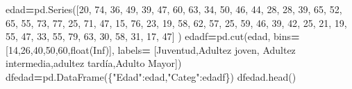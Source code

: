 \documentclass[
]{book}
\newenvironment{Shaded}{\begin{snugshade}}{\end{snugshade}}
\newcommand{\BuiltInTok}[1]{#1}
\newcommand{\DecValTok}[1]{\textcolor[rgb]{0.00,0.00,0.81}{#1}}
\newcommand{\NormalTok}[1]{#1}
\newcommand{\OperatorTok}[1]{\textcolor[rgb]{0.81,0.36,0.00}{\textbf{#1}}}
\newcommand{\StringTok}[1]{\textcolor[rgb]{0.31,0.60,0.02}{#1}}
\theoremstyle{definition}
\theoremstyle{definition}
\theoremstyle{definition}
\theoremstyle{definition}
\theoremstyle{remark}
\begin{document}
\begin{Shaded}
\begin{Highlighting}[]
\NormalTok{edad}\OperatorTok{=}\NormalTok{pd.Series([}\DecValTok{20}\NormalTok{, }\DecValTok{74}\NormalTok{, }\DecValTok{36}\NormalTok{, }\DecValTok{49}\NormalTok{, }\DecValTok{39}\NormalTok{, }\DecValTok{47}\NormalTok{, }\DecValTok{60}\NormalTok{, }\DecValTok{63}\NormalTok{, }\DecValTok{34}\NormalTok{, }\DecValTok{50}\NormalTok{,}
\DecValTok{46}\NormalTok{, }\DecValTok{44}\NormalTok{, }\DecValTok{28}\NormalTok{, }\DecValTok{28}\NormalTok{, }\DecValTok{39}\NormalTok{, }\DecValTok{65}\NormalTok{, }\DecValTok{52}\NormalTok{, }\DecValTok{65}\NormalTok{, }\DecValTok{55}\NormalTok{, }\DecValTok{73}\NormalTok{,}
\DecValTok{77}\NormalTok{, }\DecValTok{25}\NormalTok{, }\DecValTok{71}\NormalTok{, }\DecValTok{47}\NormalTok{, }\DecValTok{15}\NormalTok{, }\DecValTok{76}\NormalTok{, }\DecValTok{23}\NormalTok{, }\DecValTok{19}\NormalTok{, }\DecValTok{58}\NormalTok{, }\DecValTok{62}\NormalTok{,}
\DecValTok{57}\NormalTok{, }\DecValTok{25}\NormalTok{, }\DecValTok{59}\NormalTok{, }\DecValTok{46}\NormalTok{, }\DecValTok{39}\NormalTok{, }\DecValTok{42}\NormalTok{, }\DecValTok{25}\NormalTok{, }\DecValTok{21}\NormalTok{, }\DecValTok{19}\NormalTok{, }\DecValTok{55}\NormalTok{,}
\DecValTok{47}\NormalTok{, }\DecValTok{33}\NormalTok{, }\DecValTok{55}\NormalTok{, }\DecValTok{79}\NormalTok{, }\DecValTok{63}\NormalTok{, }\DecValTok{30}\NormalTok{, }\DecValTok{58}\NormalTok{, }\DecValTok{31}\NormalTok{, }\DecValTok{17}\NormalTok{, }\DecValTok{47}\NormalTok{] )}
\NormalTok{edadf}\OperatorTok{=}\NormalTok{pd.cut(edad, bins}\OperatorTok{=}\NormalTok{[}\DecValTok{14}\NormalTok{,}\DecValTok{26}\NormalTok{,}\DecValTok{40}\NormalTok{,}\DecValTok{50}\NormalTok{,}\DecValTok{60}\NormalTok{,}\BuiltInTok{float}\NormalTok{(}\StringTok{\textquotesingle{}Inf\textquotesingle{}}\NormalTok{)],}
\NormalTok{labels}\OperatorTok{=}\NormalTok{ [}\StringTok{\textquotesingle{}Juventud\textquotesingle{}}\NormalTok{,}\StringTok{\textquotesingle{}Adultez joven\textquotesingle{}}\NormalTok{,}
\StringTok{\textquotesingle{}Adultez intermedia\textquotesingle{}}\NormalTok{,}\StringTok{\textquotesingle{}adultez tardía\textquotesingle{}}\NormalTok{,}\StringTok{\textquotesingle{}Adulto Mayor\textquotesingle{}}\NormalTok{]) }
\NormalTok{dfedad}\OperatorTok{=}\NormalTok{pd.DataFrame(\{}\StringTok{"Edad"}\NormalTok{:edad,}\StringTok{"Categ"}\NormalTok{:edadf\})}
\NormalTok{dfedad.head()}
\end{Highlighting}
\end{Shaded}
\end{document}
